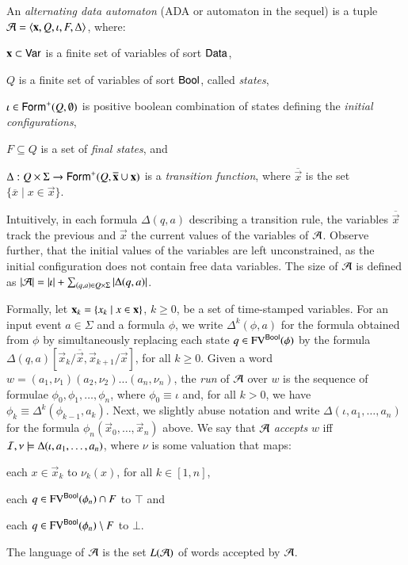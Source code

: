 \documentclass[10pt,conference,letterpaper,twocolumn]{IEEEtran}
\begin{document}
An \emph{alternating data automaton} (ADA or automaton in the sequel)
is a tuple $\mathcal{A} = \left\langle \mathbf x,Q,\iota,F,\Delta \right\rangle$,
where: \begin{compactitem}
%
\item $\mathbf x \subset \mathsf{Var}$ is a finite set of variables of sort
  $\mathsf{Data}$,
%
\item $Q$ is a finite set of variables of sort $\mathsf{Bool}$, called
  \emph{states},
%
\item $\iota \in \mathsf{Form}^+(Q,\emptyset)$ is positive boolean combination
  of states defining the \emph{initial configurations},
%
\item $F \subseteq Q$ is a set of \emph{final states}, and
%
\item $\Delta : Q \times \Sigma \rightarrow
  \mathsf{Form}^+(Q,\overline{\mathbf x}\cup\mathbf x)$ is a \emph{transition
    function}, where $\overline{\vec{x}}$ is the set $\{\overline{x}
  \mid x \in \vec{x}\}$.
\end{compactitem}
Intuitively, in each formula $\Delta(q,a)$ describing a transition
rule, the variables $\overline{\vec{x}}$ track the previous and
$\vec{x}$ the current values of the variables of $\mathcal{A}$. Observe
further, that the initial values of the variables are left
unconstrained, as the initial configuration does not contain free
data variables. The size of $\mathcal{A}$ is defined as ${|{\mathcal{A}}|} = {|{\iota}|}
+ \sum_{(q,a) \in Q\times\Sigma}{|{\Delta(q,a)}|}$.

Formally, let $\mathbf x_k = \left\{ x_k \mid x \in \mathbf x \right\}$, $k\geq0$, be
a set of time-stamped variables. For an input event $a \in \Sigma$ and
a formula $\phi$, we write $\Delta^k(\phi,a)$ for the formula obtained
from $\phi$ by simultaneously replacing each state $q \in
\mathrm{FV}^{\mathsf{Bool}}(\phi)$ by the formula
$\Delta(q,a)[\vec{x}_k/\overline{\vec{x}},\vec{x}_{k+1}/\vec{x}]$, for
all $k\geq0$. Given a word $w = (a_1,\nu_1)(a_2,\nu_2) \ldots
(a_n,\nu_n)$, the \emph{run} of $\mathcal{A}$ over $w$ is the sequence of
formulae $\phi_0,\phi_1,\ldots,\phi_n$, where $\phi_0 \equiv \iota$
and, for all $k > 0$, we have $\phi_k \equiv
\Delta^k(\phi_{k-1},a_k)$. Next, we slightly abuse notation and write
$\Delta(\iota,a_1,\ldots,a_n)$ for the formula
$\phi_n(\vec{x}_0,\ldots,\vec{x}_n)$ above. We say that $\mathcal{A}$
\emph{accepts} $w$ iff $\mathcal{I},\nu \models \Delta(\iota,a_1,\ldots,a_n)$,
where $\nu$ is some valuation that maps:\begin{inparaenum}[(1)]
%
\item each $x \in \vec{x}_k$ to $\nu_k(x)$, for all $k\in[1,n]$, 
%
\item each $q \in \mathrm{FV}^{\mathsf{Bool}}(\phi_n) \cap F$ to $\top$ and 
%
\item each $q \in \mathrm{FV}^{\mathsf{Bool}}(\phi_n) \setminus F$ to $\bot$.
\end{inparaenum}
The language of $\mathcal{A}$ is the set $L(\mathcal{A})$ of words accepted by $\mathcal{A}$.
\end{document}
